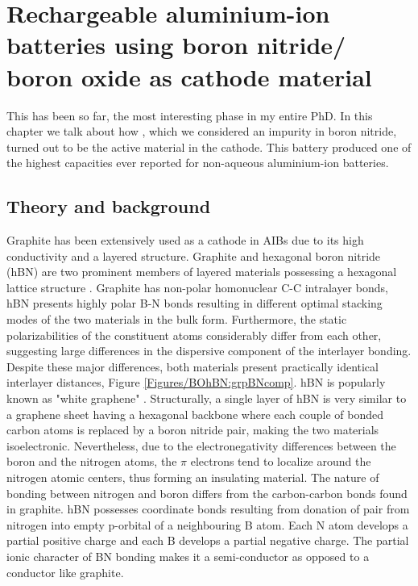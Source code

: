 \chapter{Rechargeable aluminium-ion batteries using boron nitride/ boron oxide as cathode material} %
This has been so far, the most interesting phase in my entire PhD. In this chapter we talk about how , which we considered an impurity in boron nitride, turned out to be the active material in the cathode. This battery produced one of the highest capacities ever reported for non-aqueous aluminium-ion batteries.   \label{BOhBN} %
\newcommand{\keyword}[1]{\textbf{#1}}
\newcommand{\tabhead}[1]{\textbf{#1}}
\newcommand{\code}[1]{\texttt{#1}}
\newcommand{\file}[1]{\texttt{\bfseries#1}}
\newcommand{\option}[1]{\texttt{\itshape#1}}
\section{Theory and background}
Graphite has been extensively used as a cathode in AIBs due to its high conductivity and a layered structure. Graphite and hexagonal boron nitride (hBN) are two prominent members of layered materials possessing a hexagonal lattice structure \cite{hod_graphite_2012}. Graphite has non-polar homonuclear C-C intralayer bonds, hBN presents highly polar B-N bonds resulting in different optimal stacking modes of the two materials in the bulk form. Furthermore, the static polarizabilities of the constituent atoms considerably differ from each other, suggesting large differences in the dispersive component of the interlayer bonding. Despite these major differences, both materials present practically identical interlayer distances, Figure \ref{Figures/BOhBN:grpBNcomp}. hBN is popularly known as "white graphene" \cite{song_large_2010, zeng_white_2010}. Structurally, a single layer of hBN is very similar to a graphene sheet having a hexagonal backbone where each couple of bonded carbon atoms is replaced by a boron nitride pair, making the two materials isoelectronic. Nevertheless, due to the electronegativity differences between the boron and the nitrogen atoms, the $\pi$ electrons tend to localize around the nitrogen atomic centers, thus forming an insulating material. The nature of bonding between nitrogen and boron differs from the carbon-carbon bonds found in graphite. hBN possesses coordinate bonds resulting from donation of  pair from nitrogen into empty p-orbital of a neighbouring B atom. Each N atom develops a partial positive charge and each B develops a partial negative charge. The partial ionic character of BN bonding makes it a semi-conductor as opposed to a conductor like graphite. 

